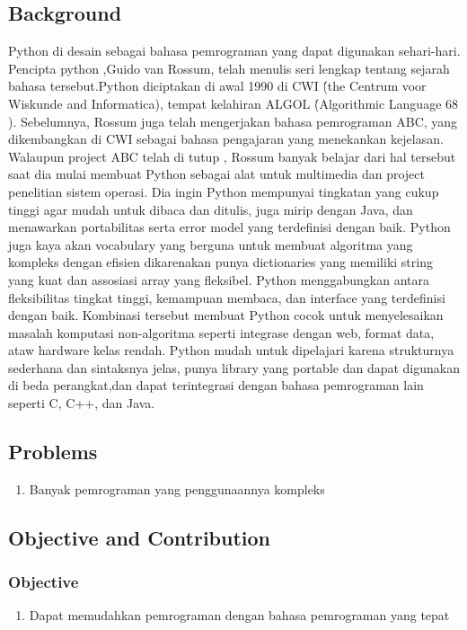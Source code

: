 \subsection{Background}
Python di desain sebagai bahasa pemrograman yang dapat digunakan sehari-hari. Pencipta python ,Guido van Rossum, telah menulis seri lengkap tentang sejarah bahasa tersebut.Python diciptakan di awal 1990 di CWI \'(the Centrum voor Wiskunde and Informatica), tempat kelahiran ALGOL \'(Algorithmic Language 68 ). Sebelumnya, Rossum juga telah mengerjakan bahasa pemrograman ABC, yang dikembangkan di  CWI sebagai bahasa pengajaran yang menekankan kejelasan. Walaupun project ABC telah di tutup , Rossum banyak belajar dari hal tersebut saat dia mulai membuat Python sebagai alat untuk multimedia dan project penelitian sistem operasi. Dia ingin Python mempunyai tingkatan yang cukup tinggi agar mudah untuk dibaca dan ditulis, juga mirip dengan Java, dan menawarkan portabilitas serta error model yang terdefinisi dengan baik.
\linebreak
\linebreak
Python juga kaya akan vocabulary yang berguna untuk membuat algoritma yang kompleks dengan efisien dikarenakan punya dictionaries yang memiliki string yang kuat dan assosiasi array yang fleksibel. Python menggabungkan antara fleksibilitas tingkat tinggi, kemampuan membaca, dan interface yang terdefinisi dengan baik. Kombinasi tersebut membuat Python cocok untuk menyelesaikan masalah komputasi non-algoritma seperti integrase dengan web, format data, ataw hardware kelas rendah. Python mudah untuk dipelajari karena strukturnya sederhana dan sintaksnya jelas, punya library yang portable dan dapat digunakan di beda perangkat,dan dapat terintegrasi dengan bahasa pemrograman lain seperti C, C++, dan Java.
\subsection{Problems}
\begin{enumerate}
\item Banyak pemrograman yang penggunaannya kompleks
\end{enumerate}
\subsection{Objective and Contribution}
\subsubsection{Objective}
\begin{enumerate}
\item Dapat memudahkan pemrograman dengan bahasa pemrograman yang tepat
\end{enumerate}
